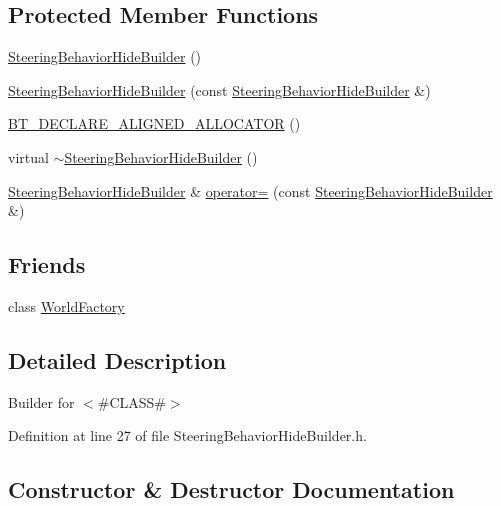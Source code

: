 \subsection*{Protected Member Functions}
\begin{DoxyCompactItemize}
\item 
\mbox{\hyperlink{classnjli_1_1_steering_behavior_hide_builder_a4e8243b317760698dc69916071379e02}{Steering\+Behavior\+Hide\+Builder}} ()
\item 
\mbox{\hyperlink{classnjli_1_1_steering_behavior_hide_builder_ad5a3939d01b55b471b0d6a7836ebc8d9}{Steering\+Behavior\+Hide\+Builder}} (const \mbox{\hyperlink{classnjli_1_1_steering_behavior_hide_builder}{Steering\+Behavior\+Hide\+Builder}} \&)
\item 
\mbox{\hyperlink{classnjli_1_1_steering_behavior_hide_builder_a6f34540770f9369867193dac2b50bd13}{B\+T\+\_\+\+D\+E\+C\+L\+A\+R\+E\+\_\+\+A\+L\+I\+G\+N\+E\+D\+\_\+\+A\+L\+L\+O\+C\+A\+T\+OR}} ()
\item 
virtual \mbox{\hyperlink{classnjli_1_1_steering_behavior_hide_builder_ac51c221006b31129a6cac95cd0e8c629}{$\sim$\+Steering\+Behavior\+Hide\+Builder}} ()
\item 
\mbox{\hyperlink{classnjli_1_1_steering_behavior_hide_builder}{Steering\+Behavior\+Hide\+Builder}} \& \mbox{\hyperlink{classnjli_1_1_steering_behavior_hide_builder_a44e381a66afa4ed7ec8efa1f4676f580}{operator=}} (const \mbox{\hyperlink{classnjli_1_1_steering_behavior_hide_builder}{Steering\+Behavior\+Hide\+Builder}} \&)
\end{DoxyCompactItemize}
\subsection*{Friends}
\begin{DoxyCompactItemize}
\item 
class \mbox{\hyperlink{classnjli_1_1_steering_behavior_hide_builder_acb96ebb09abe8f2a37a915a842babfac}{World\+Factory}}
\end{DoxyCompactItemize}


\subsection{Detailed Description}
Builder for $<$\#\+C\+L\+A\+SS\#$>$ 

Definition at line 27 of file Steering\+Behavior\+Hide\+Builder.\+h.



\subsection{Constructor \& Destructor Documentation}
\mbox{\label{classnjli_1_1_steering_behavior_hide_builder_a4e8243b317760698dc69916071379e02}} 

